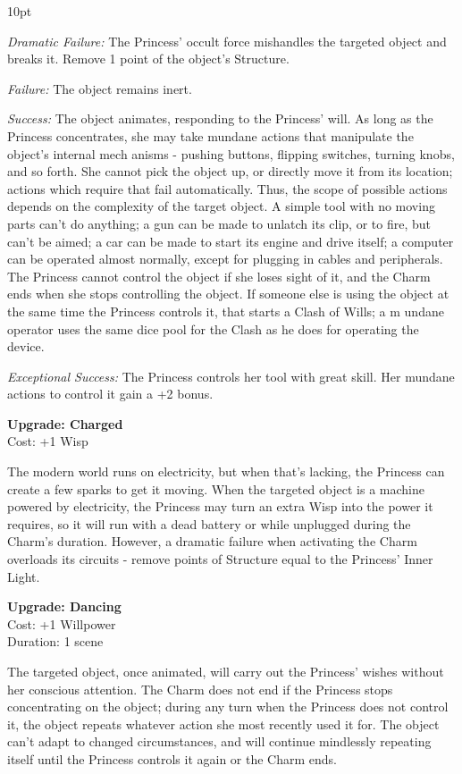 \begin{myindentpar}{10pt}

\emph{Dramatic  Failure:}  The  Princess’  occult  force  mishandles  the  targeted  object  and
breaks it. Remove 1 point of the object’s Structure.

\emph{Failure:} The object remains inert.

\emph{Success:} The object animates, responding to the Princess’ will. As long as the Princess
concentrates, she may take mundane actions that manipulate the object’s internal mech
anisms - pushing buttons, flipping switches, turning knobs, and so forth. She cannot pick
the object up, or directly move it from its location; actions which require that fail automatically. Thus, the scope of possible actions depends on the complexity of the target object. A
simple tool with no moving parts can’t do anything; a gun can be made to unlatch its clip, or to fire, but can’t be aimed; a car can be made to start its engine and drive itself; a computer
can be operated almost normally, except for plugging in cables and peripherals.
The Princess cannot control the object if she loses sight of it, and the Charm ends when
she stops controlling the object. If someone else is using the object at the same time the
Princess controls it, that starts a Clash of Wills; a m
undane operator uses the same dice
pool for the Clash as he does for operating the device.

\emph{Exceptional Success:} The Princess controls her tool with great skill. Her mundane
actions to control it gain a +2 bonus.

\textbf{Upgrade: Charged}\\
Cost: +1 Wisp

The modern world runs on electricity, but when that’s lacking, the Princess can create
a few sparks to get it moving. When the targeted object is a machine powered by electricity,
the Princess may turn an extra Wisp into the power it requires, so it will run with a dead
battery or while unplugged during the Charm’s duration. However, a dramatic failure when
activating the Charm overloads its circuits - remove points of Structure equal to the Princess’
Inner Light.

\textbf{Upgrade: Dancing}\\
Cost: +1 Willpower\\
Duration: 1 scene

The targeted object, once animated, will carry out the Princess’ wishes without her conscious attention. The Charm does not end if the Princess stops concentrating on the object;
during any turn when the Princess does not control it, the object repeats whatever action she
most recently used it for. The object can’t adapt to changed circumstances, and will continue
mindlessly repeating itself until the Princess controls it again or the Charm ends.


\end{myindentpar}
